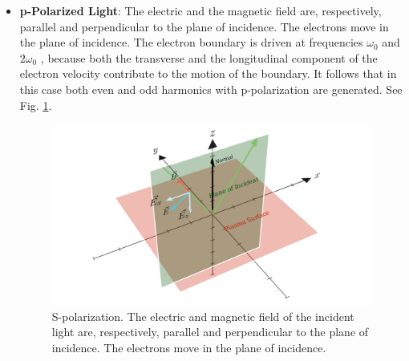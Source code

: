 \documentclass[12pt]{article}
\begin{document}
\begin{itemize}
    \item \textbf{p-Polarized Light}: The electric and the magnetic field are, respectively, parallel and perpendicular to the plane of incidence. The electrons move in the plane of incidence. The electron boundary is driven at frequencies $\omega_0$ and $2\omega_0$ , because both the transverse and the longitudinal component of the electron velocity contribute to the motion of the boundary. It follows that in this case both even and odd harmonics with p-polarization are generated. See Fig. \ref{fig:p-polarized}.
          \begin{figure}[h]
              \centering
              \includegraphics[width=1\textwidth]{images/p.png}
              \caption{S-polarization. The electric and magnetic field of the incident light are, respectively, parallel and perpendicular to the plane of incidence. The electrons move in the plane of incidence.}
              \label{fig:p-polarized}
          \end{figure}


\end{itemize}
\end{document}
